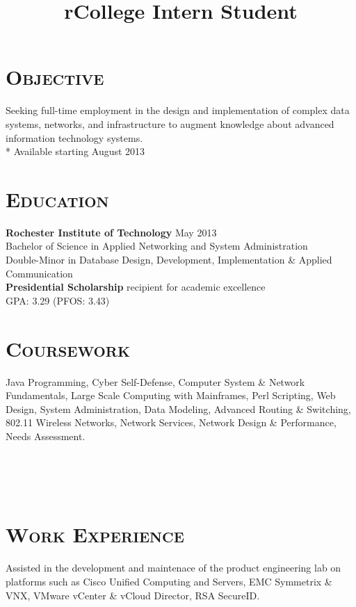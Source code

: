 \begin{resume}


\section{\textsc{Objective}}
Seeking full-time employment in the design and implementation of complex data systems, networks, and infrastructure to augment knowledge about advanced information technology systems. \\*
Available starting August 2013
\section{\textsc{Education}}

\textbf{Rochester Institute of Technology} \hfill May 2013 \\
Bachelor of Science in Applied Networking and System Administration \\
Double-Minor in Database Design, Development, Implementation \& Applied Communication \\
{\bf Presidential Scholarship} recipient for academic excellence \\
GPA: 3.29 (PFOS: 3.43)

\section{\textsc{Coursework}}

Java Programming, Cyber Self-Defense, Computer System \& Network Fundamentals, Large Scale Computing with Mainframes, Perl Scripting, Web Design, System Administration, Data Modeling, Advanced Routing \& Switching, 802.11 Wireless Networks, Network Services, Network Design \& Performance, Needs Assessment.

\begin{formatb}
  \title{r}\\
  \\
  \body\\
\end{formatb}

\section{\textsc{Work Experience}}

\title{College Intern Student}
\begin{position}
Assisted in the development and maintenace of the product engineering lab on platforms such as Cisco Unified Computing and Servers, EMC Symmetrix \& VNX, VMware vCenter \& vCloud Director, RSA SecureID.
\end{position}


\end{resume}
